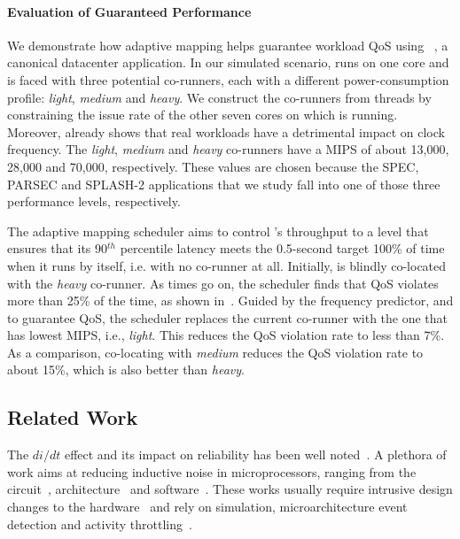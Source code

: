 \paragraph{Evaluation of Guaranteed Performance}

We demonstrate how adaptive mapping helps guarantee workload QoS using ~\cite{ferdman2012clearing}, a canonical datacenter application. In our simulated scenario,  runs on one core and is faced with three potential co-runners, each with a different power-consumption profile: \emph{light}, \emph{medium} and \emph{heavy}. We construct the co-runners from  threads by constraining the issue rate of the other seven cores on which  is running. 
Moreover,  already shows that real workloads have a detrimental impact on clock frequency. The \emph{light}, \emph{medium} and \emph{heavy} co-runners have a MIPS of about 13,000, 28,000 and 70,000, respectively. These values are chosen because the SPEC, PARSEC and SPLASH-2 applications that we study fall into one of those three performance levels, respectively. 

The adaptive mapping scheduler aims to control 's throughput to a level that ensures that its 90$^{th}$ percentile latency meets the 0.5-second target 100\% of time when it runs by itself, i.e. with no co-runner at all. Initially,  is blindly co-located with the \emph{heavy} co-runner. As times go on, the scheduler finds that QoS violates more than 25\% of the time, as shown in~. Guided by the frequency predictor, and to guarantee QoS, the scheduler replaces the current co-runner with the one that has lowest MIPS, i.e., \emph{light}. This reduces the QoS violation rate to less than 7\%. As a comparison, co-locating with \emph{medium} reduces the QoS violation rate to about 15\%, which is also better than \emph{heavy}.

\subsection{Related Work}
\label{sec:ams:related}

The $di/dt$ effect and its impact on reliability has been well noted~\cite{james2007comparison,reddi2010voltage,kim2012audit,bertran2014voltage}. A plethora of work aims at reducing inductive noise in microprocessors, ranging from the circuit~\cite{ernst2003razor,blaauw2008razorii}, architecture~\cite{grochowski2002microarchitectural,powell2003pipeline,gupta2007understanding,gupta2008decor,gupta2009event,reddi2009voltage,reddi2010voltage,miller2012vrsync,zhang2014architecture} and software~\cite{reddi2010eliminating}. These works usually require intrusive design changes to the hardware~\cite{ernst2003razor,blaauw2008razorii,gupta2008decor,reddi2009voltage} and rely on simulation, microarchitecture event detection and activity throttling~\cite{grochowski2002microarchitectural,powell2003pipeline,gupta2009event,reddi2009voltage,reddi2010eliminating,miller2012vrsync}.

